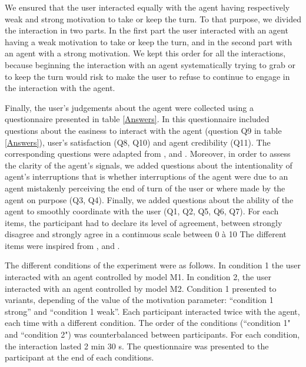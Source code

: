 We ensured that the user interacted equally with the agent having respectively weak and strong motivation to take or keep the turn. To that purpose, we divided the interaction in two parts. In the first part the user interacted with an agent having a weak motivation to take or keep the turn, and in the second part with an agent with a strong motivation.
We kept this order for all the interactions, because beginning the interaction with an agent systematically trying to grab or to keep the turn would risk to make the user to refuse to continue to engage in the interaction with the agent. 

Finally, the user's judgements about the agent were collected using a questionnaire presented in table \ref{Answers}. In this questionnaire included questions about the easiness to interact with the agent (question Q9 in table \ref{Answers}), user's satisfaction (Q8, Q10) and agent credibility (Q11). The corresponding questions were adapted from \cite{skantze_towards_2010}, \cite{bevacqua_effects_2014} and \cite{de_vault_toward_2015}. Moreover, in order to assess the clarity of the agent's signals, we added questions about the intentionality of agent's interruptions that is whether interruptions of the agent were due to an agent mistakenly perceiving the end of turn of the user or where made by the agent on purpose (Q3, Q4). Finally, we added questions about the ability of the agent to smoothly coordinate with the user (Q1, Q2, Q5, Q6, Q7). For each items, the participant had to declare its level of agreement, between strongly disagree and strongly agree in a continuous scale between 0 à 10 The different items were inspired from \cite{skantze_towards_2010}, \cite{bevacqua_effects_2014} and \cite{de_vault_toward_2015}.

The different conditions of the experiment were as follows.
In condition 1 the user interacted with an agent controlled by model M1.
In condition 2, the user interacted with an agent controlled by model M2.
Condition 1 presented to variants, depending of the value of the motivation parameter: ``condition 1 strong'' and ``condition 1 weak''. 
Each participant interacted twice with the agent, each time with a different condition.
The order of the conditions (``condition 1" and ``condition 2") was counterbalanced between participants. For each condition, the interaction lasted 2 min 30 s. The questionnaire was presented to the participant at the end of each conditions.


